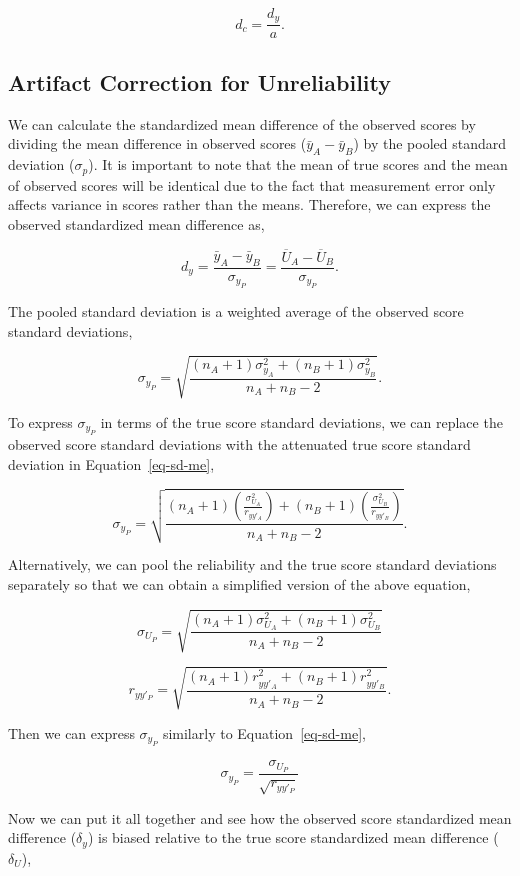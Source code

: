 \documentclass[
  letterpaper,
  DIV=11,
  numbers=noendperiod]{scrreprt}
\begin{document}
\[
d_c = \frac{d_y}{a}.
\]

\hypertarget{sec-d-SMD}{%
\subsection{Artifact Correction for Unreliability}\label{sec-d-SMD}}

We can calculate the standardized mean difference of the observed scores
by dividing the mean difference in observed scores
(\(\bar{y}_A-\bar{y}_B\)) by the pooled standard deviation
(\(\sigma_p\)). It is important to note that the mean of true scores and
the mean of observed scores will be identical due to the fact that
measurement error only affects variance in scores rather than the means.
Therefore, we can express the observed standardized mean difference as,

\[
d_y = \frac{\bar{y}_A-\bar{y}_B}{\sigma_{y_P}} = \frac{\overline{U}_A-\overline{U}_B}{\sigma_{y_P}}.
\]

The pooled standard deviation is a weighted average of the observed
score standard deviations,

\[
\sigma_{y_P}=\sqrt{\frac{(n_A+1)\sigma^2_{y_A}+(n_B+1)\sigma^2_{y_B}}{n_A+n_B-2}}.
\]

To express \(\sigma_{y_P}\) in terms of the true score standard
deviations, we can replace the observed score standard deviations with
the attenuated true score standard deviation in Equation~\ref{eq-sd-me},

\[
\sigma_{y_P} = \sqrt{\frac{(n_A+1)\left(\frac{\sigma^2_{U_A}}{r_{yy'_A}}\right)+(n_B+1)\left(\frac{\sigma^2_{U_B}}{r_{yy'_B}}\right)}{n_A + n_B - 2}}.
\]

Alternatively, we can pool the reliability and the true score standard
deviations separately so that we can obtain a simplified version of the
above equation,

\[
\sigma_{U_P} = \sqrt{\frac{(n_A+1)\sigma_{U_A}^2+(n_B+1)\sigma_{U_B}^2}{n_A + n_B - 2}}
\]

\[
r_{yy'_P} = \sqrt{\frac{(n_A+1) r_{yy'_A}^2+(n_B+1)r_{yy'_B}^2}{n_A + n_B - 2}}.
\]

Then we can express \(\sigma_{y_P}\) similarly to
Equation~\ref{eq-sd-me},

\[
\sigma_{y_P} = \frac{\sigma_{U_P}}{\sqrt{r_{yy'_P}}}
\]

Now we can put it all together and see how the observed score
standardized mean difference (\(\delta_y\)) is biased relative to the
true score standardized mean difference (\(\delta_U\)),
\end{document}

